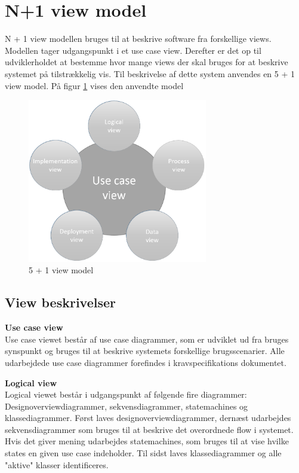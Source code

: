 \section{N+1 view model}

N + 1 view modellen bruges til at beskrive software fra forskellige views. Modellen tager udgangspunkt i et use case view. Derefter er det op til udviklerholdet at bestemme hvor mange views der skal bruges for at beskrive systemet på tilstrækkelig vis. Til beskrivelse af dette system anvendes en 5 + 1 view model. På figur \ref{fig:5 + 1 view model} vises den anvendte model


\vspace{-5pt}
\begin{figure}[H]
	\centering
	\includegraphics[width=0.7\textwidth]{Billeder/n+1}
	\vspace{0cm}
	\caption{5 + 1 view model}
	\label{fig:5 + 1 view model}
\end{figure}


\newpage

\subsection{View beskrivelser}

\textbf{Use case view}\\
Use case viewet består af use case diagrammer, som er udviklet ud fra bruges synspunkt og bruges til at beskrive systemets forskellige brugsscenarier. Alle udarbejdede use case diagrammer forefindes i kravspecifikations dokumentet.

\textbf{Logical view}\\
Logical viewet består i udgangspunkt af følgende fire diagrammer: Designoverviewdiagrammer, sekvensdiagrammer, statemachines og klassediagrammer. Først laves designoverviewdiagrammer, dernæst udarbejdes sekvensdiagrammer som bruges til at beskrive det overordnede flow i systemet. Hvis det giver mening udarbejdes statemachines, som bruges til at vise hvilke states en given use case indeholder. Til sidst laves klassediagrammer og alle "aktive" klasser identificeres. 

